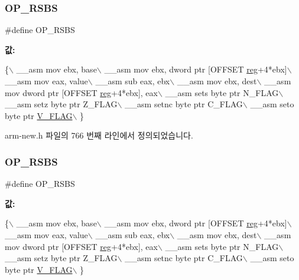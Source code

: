 \subsubsection{\texorpdfstring{O\+P\+\_\+\+R\+S\+BS}{OP\_RSBS}\hspace{0.1cm}{\footnotesize\ttfamily [1/2]}}
{\footnotesize\ttfamily \#define O\+P\+\_\+\+R\+S\+BS}

{\bfseries 값\+:}
\begin{DoxyCode}
\{\(\backslash\)
        \_\_asm mov ebx, base\(\backslash\)
        \_\_asm mov ebx, dword ptr [OFFSET \mbox{\hyperlink{_g_b_a_8h_ae29faba89509024ffd1a292badcedf2d}{reg}}+4*ebx]\(\backslash\)
        \_\_asm mov eax, value\(\backslash\)
        \_\_asm sub eax, ebx\(\backslash\)
        \_\_asm mov ebx, dest\(\backslash\)
        \_\_asm mov dword ptr [OFFSET \mbox{\hyperlink{_g_b_a_8h_ae29faba89509024ffd1a292badcedf2d}{reg}}+4*ebx], eax\(\backslash\)
        \_\_asm sets byte ptr N\_FLAG\(\backslash\)
        \_\_asm setz byte ptr Z\_FLAG\(\backslash\)
        \_\_asm setnc byte ptr C\_FLAG\(\backslash\)
        \_\_asm seto byte ptr \mbox{\hyperlink{_g_b_a_8h_a11a0e7b14a93be5eb2720b0151900919}{V\_FLAG}}\(\backslash\)
      \}
\end{DoxyCode}


arm-\/new.\+h 파일의 766 번째 라인에서 정의되었습니다.

\mbox{\label{_g_b_a_8cpp_abe9b27e4c5be88069b41e0a7c9ccb342}} 
\subsubsection{\texorpdfstring{O\+P\+\_\+\+R\+S\+BS}{OP\_RSBS}\hspace{0.1cm}{\footnotesize\ttfamily [2/2]}}
{\footnotesize\ttfamily \#define O\+P\+\_\+\+R\+S\+BS}

{\bfseries 값\+:}
\begin{DoxyCode}
\{\(\backslash\)
        \_\_asm mov ebx, base\(\backslash\)
        \_\_asm mov ebx, dword ptr [OFFSET \mbox{\hyperlink{_g_b_a_8h_ae29faba89509024ffd1a292badcedf2d}{reg}}+4*ebx]\(\backslash\)
        \_\_asm mov eax, value\(\backslash\)
        \_\_asm sub eax, ebx\(\backslash\)
        \_\_asm mov ebx, dest\(\backslash\)
        \_\_asm mov dword ptr [OFFSET \mbox{\hyperlink{_g_b_a_8h_ae29faba89509024ffd1a292badcedf2d}{reg}}+4*ebx], eax\(\backslash\)
        \_\_asm sets byte ptr N\_FLAG\(\backslash\)
        \_\_asm setz byte ptr Z\_FLAG\(\backslash\)
        \_\_asm setnc byte ptr C\_FLAG\(\backslash\)
        \_\_asm seto byte ptr \mbox{\hyperlink{_g_b_a_8h_a11a0e7b14a93be5eb2720b0151900919}{V\_FLAG}}\(\backslash\)
      \}
\end{DoxyCode}
\mbox{\label{arm-new_8h_a1ded477d09f3387120843cc98f2aa147}} 
